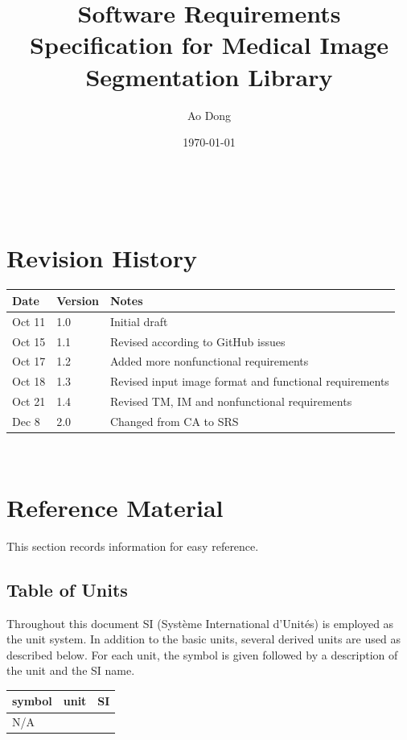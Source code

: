 \documentclass[12pt]{article}
\begin{document}
\title{Software Requirements Specification for Medical Image Segmentation
Library}
\author{Ao Dong}
\date{\today}

\maketitle

~\newpage


\section{Revision History}

\begin{tabularx}{\textwidth}{p{3cm}p{2cm}X}
\toprule {\bf Date} & {\bf Version} & {\bf Notes}\\
\midrule
Oct 11 & 1.0 & Initial draft\\
Oct 15 & 1.1 & Revised according to GitHub issues\\
Oct 17 & 1.2 & Added more nonfunctional requirements\\
Oct 18 & 1.3 & Revised input image format and functional requirements\\
Oct 21 & 1.4 & Revised TM, IM and nonfunctional requirements\\
Dec 8 & 2.0 & Changed from CA to SRS\\
\bottomrule
\end{tabularx}

~\newpage
	
\section{Reference Material}

This section records information for easy reference.

\subsection{Table of Units}

Throughout this document SI (Syst\`{e}me International d'Unit\'{e}s) is
employed as the unit system. In addition to the basic units, several derived
units are
used as described below.  For each unit, the symbol is given followed by a
description of the unit and the SI name.
~\newline

\renewcommand{\arraystretch}{1.2}
  \noindent \begin{tabular}{l l l} 
    \toprule		
    \textbf{symbol} & \textbf{unit} & \textbf{SI}\\
    \midrule 
    N/A\\
    \bottomrule
  \end{tabular}
\end{document}
